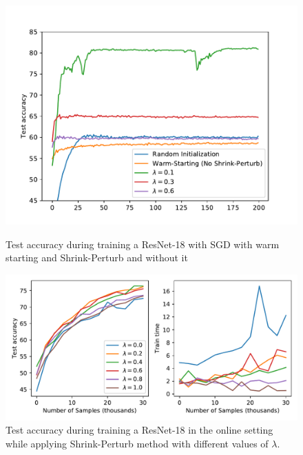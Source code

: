 \begin{figure}
\begin{minipage}[t]{.4\linewidth}
    \includegraphics[width=\linewidth]{figures/fig1_shrink_pertrub_test_accuracy.pdf}
    \caption{Test accuracy during training a ResNet-18 with SGD with warm starting and Shrink-Perturb and without it}
    \label{fig:fig1_shrink}
\end{minipage}
\hfill
\begin{minipage}[t]{.55\linewidth}
    \includegraphics[width=\linewidth]{figures/figure7}
    \caption{Test accuracy during training a ResNet-18 in the online setting while applying Shrink-Perturb method with different values of $\lambda$.}
    \label{fig:fig7}
\end{minipage}
\end{figure}


